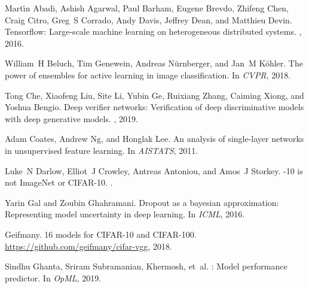 \documentclass{article}
\begin{document}
\begin{thebibliography}{}

Mart{\'\i}n Abadi, Ashish Agarwal, Paul Barham, Eugene Brevdo, Zhifeng Chen,
  Craig Citro, Greg~S Corrado, Andy Davis, Jeffrey Dean, and Matthieu Devin.
\newblock Tensorflow: Large-scale machine learning on heterogeneous distributed
  systems.
, 2016.

William~H Beluch, Tim Genewein, Andreas N{\"u}rnberger, and Jan~M K{\"o}hler.
\newblock The power of ensembles for active learning in image classification.
\newblock In {\em CVPR}, 2018.

Tong Che, Xiaofeng Liu, Site Li, Yubin Ge, Ruixiang Zhang, Caiming Xiong, and
  Yoshua Bengio.
\newblock Deep verifier networks: Verification of deep discriminative models
  with deep generative models.
, 2019.

Adam Coates, Andrew Ng, and Honglak Lee.
\newblock An analysis of single-layer networks in unsupervised feature
  learning.
\newblock In {\em AISTATS}, 2011.

Luke~N Darlow, Elliot~J Crowley, Antreas Antoniou, and Amos~J Storkey.
-10 is not {ImageNet} or {CIFAR}-10.
.

Yarin Gal and Zoubin Ghahramani.
\newblock Dropout as a bayesian approximation: Representing model uncertainty
  in deep learning.
\newblock In {\em ICML}, 2016.

Geifmany.
16 models for {CIFAR}-10 and {CIFAR}-100.
\newblock \url{https://github.com/geifmany/cifar-vgg}, 2018.

Sindhu Ghanta, Sriram Subramanian, Khermosh, et~al.
: Model performance predictor.
\newblock In {\em OpML}, 2019.


\end{thebibliography}
\end{document}
